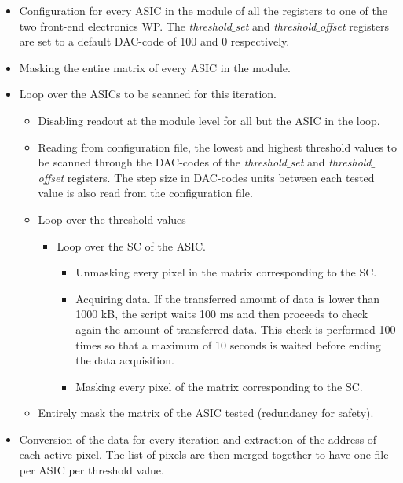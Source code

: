 		    \begin{itemize}
		    	\item Configuration for every ASIC in the module of all the registers to one of the two front-end electronics WP. The \textit{threshold$\_$set} and \textit{threshold$\_$offset} registers are set to a default DAC-code of 100 and 0 respectively. 
		    	\item Masking the entire matrix of every ASIC in the module. 
		    	\item Loop over the ASICs to be scanned for this iteration. 
		    	\begin{itemize}
		    		\item Disabling readout at the module level for all but the ASIC in the loop. 
		    		\item Reading from configuration file, the lowest and highest threshold values to be scanned through the DAC-codes of the \textit{threshold$\_$set} and \textit{threshold$\_$offset} registers. The step size in DAC-codes units between each tested value is also read from the configuration file.
		    		\item Loop over the threshold values 
		    			\begin{itemize}
		    				\item Loop over the SC of the ASIC.
		    				\begin{itemize}
		    					\item Unmasking every pixel in the matrix corresponding to the SC.
		    					\item Acquiring data. If the transferred amount of data is lower than 1000 kB, the script waits 100 ms and then proceeds to check again the amount of transferred data. This check is performed 100 times so that a maximum of 10 seconds is waited before ending the data acquisition. 
		    					\item Masking every pixel of the matrix corresponding to the SC. 
		    				\end{itemize}
		    			\end{itemize}
		    		\item Entirely mask the matrix of the ASIC tested (redundancy for safety).
		    	\end{itemize}
		    	\item Conversion of the data for every iteration and extraction of the address of each active pixel. The list of pixels are then merged together to have one file per ASIC per threshold value. 
		    \end{itemize}
		    
